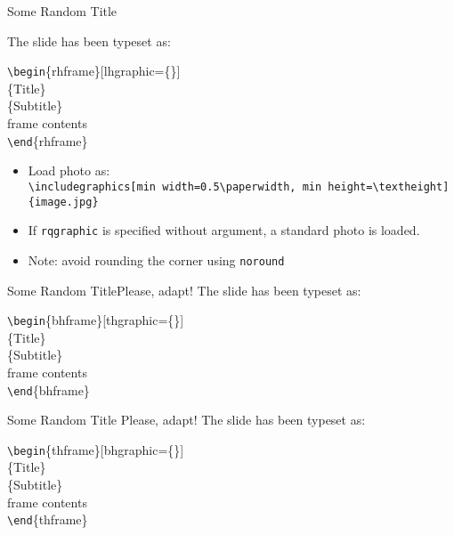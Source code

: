 \documentclass[aspectratio=1610]{beamer}
\newcommand*\command[1]{{\tt \textbackslash #1}}
\newcommand*\ind[1][2ex]{\hspace*{#1}}
\newcommand*\bframe[1][]{\command{begin}\{#1frame\}}
\newcommand*\eframe[1][]{\command{end}\{#1frame\}}
\begin{document}
\begin{rhframe}[lhgraphic,t]
  {Some Random Title}

  \small
  The slide has been typeset as:\\
  \begin{codesnippet}[\textwidth]
    \bframe[rh][lhgraphic=\{<load photo here>\}]\\
    \ind\{Title\}\\
    \ind\{Subtitle\}\\
    \ind frame contents\\
    \eframe[rh]
  \end{codesnippet}
  \smallskip

  \begin{itemize}
  \item   Load photo as:\\
    \command{includegraphics[min
      width=0.5\command{paperwidth}, min height=\command{textheight}]
      \{image.jpg\}}
  \item If \texttt{rqgraphic} is specified without argument, a standard photo
    is loaded.
  \item Note: avoid rounding the corner using \texttt{noround}
  \end{itemize}
\end{rhframe}

\begin{bhframe}[thgraphic,t]
  {Some Random Title}{Please, adapt!}
  \small
  The slide has been typeset as:
  \begin{codesnippet}[\textwidth]
    \bframe[bh][thgraphic=\{<load photo here>\}]\\
    \ind\{Title\}\\
    \ind\{Subtitle\}\\
    \ind frame contents\\
    \eframe[bh]
  \end{codesnippet}
\end{bhframe}

\begin{thframe}[bhgraphic,t]
  {Some Random Title}
  {Please, adapt!}
  \small
  The slide has been typeset as:
  \begin{codesnippet}[\textwidth]
    \bframe[th][bhgraphic=\{<load photo here>\}]\\
    \ind\{Title\}\\
    \ind\{Subtitle\}\\
    \ind frame contents\\
    \eframe[th]
  \end{codesnippet}
\end{thframe}
\end{document}
